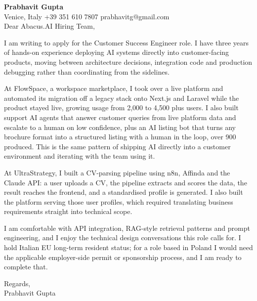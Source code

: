 \documentclass[a4paper,10.5pt]{article}
\begin{document}
\textbf{Prabhavit Gupta}\\
Venice, Italy \textbar{} +39 351 610 7807 \textbar{} prabhavitg@gmail.com\\[10pt]
Dear Abacus.AI Hiring Team,

I am writing to apply for the Customer Success Engineer role. I have three years of hands-on experience deploying AI systems directly into customer-facing products, moving between architecture decisions, integration code and production debugging rather than coordinating from the sidelines.

At FlowSpace, a workspace marketplace, I took over a live platform and automated its migration off a legacy stack onto Next.js and Laravel while the product stayed live, growing usage from 2,000 to 4,500 plus users. I also built support AI agents that answer customer queries from live platform data and escalate to a human on low confidence, plus an AI listing bot that turns any brochure format into a structured listing with a human in the loop, over 900 produced. This is the same pattern of shipping AI directly into a customer environment and iterating with the team using it.

At UltraStrategy, I built a CV-parsing pipeline using n8n, Affinda and the Claude API: a user uploads a CV, the pipeline extracts and scores the data, the result reaches the frontend, and a standardised profile is generated. I also built the platform serving those user profiles, which required translating business requirements straight into technical scope.

I am comfortable with API integration, RAG-style retrieval patterns and prompt engineering, and I enjoy the technical design conversations this role calls for. I hold Italian EU long-term resident status; for a role based in Poland I would need the applicable employer-side permit or sponsorship process, and I am ready to complete that.

Regards,\\
Prabhavit Gupta
\end{document}
